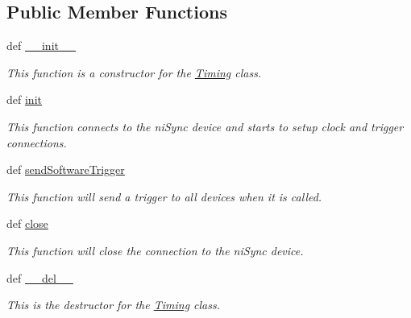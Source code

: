 \subsection*{Public Member Functions}
\begin{DoxyCompactItemize}
\item 
def \hyperlink{class_chassis_8git_1_1_timing_1_1_timing_af865d81cbb943ef3c589e1468a2c505e}{\-\_\-\-\_\-init\-\_\-\-\_\-}
\begin{DoxyCompactList}\small\item\em This function is a constructor for the \hyperlink{class_chassis_8git_1_1_timing_1_1_timing}{Timing} class. \end{DoxyCompactList}\item 
def \hyperlink{class_chassis_8git_1_1_timing_1_1_timing_a48c44c6e572b44297469ac3da312d48a}{init}
\begin{DoxyCompactList}\small\item\em This function connects to the ni\-Sync device and starts to setup clock and trigger connections. \end{DoxyCompactList}\item 
def \hyperlink{class_chassis_8git_1_1_timing_1_1_timing_a4da2ff1918154adb5ff6f1f8a1fd681a}{send\-Software\-Trigger}
\begin{DoxyCompactList}\small\item\em This function will send a trigger to all devices when it is called. \end{DoxyCompactList}\item 
def \hyperlink{class_chassis_8git_1_1_timing_1_1_timing_a2b2792f5c874a45cbe34298b1f4c1584}{close}
\begin{DoxyCompactList}\small\item\em This function will close the connection to the ni\-Sync device. \end{DoxyCompactList}\item 
def \hyperlink{class_chassis_8git_1_1_timing_1_1_timing_aeb465d81f1da5b3e5784a87870a302dd}{\-\_\-\-\_\-del\-\_\-\-\_\-}
\begin{DoxyCompactList}\small\item\em This is the destructor for the \hyperlink{class_chassis_8git_1_1_timing_1_1_timing}{Timing} class. \end{DoxyCompactList}\end{DoxyCompactItemize}

